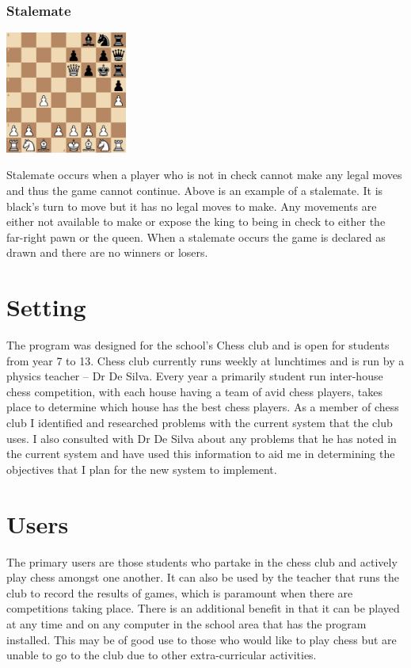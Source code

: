 \documentclass[]{report}
\begin{document}
\subsubsection{Stalemate}
\begin{center}
	\includegraphics[width=0.3\textwidth]{images/boards/stalemate_example}
\end{center}
Stalemate occurs when a player who is not in check cannot make any legal moves and thus the game cannot continue. Above is an example of a stalemate. It is black’s turn to move but it has no legal moves to make. Any movements are either not available to make or expose the king to being in check to either the far-right pawn or the queen. When a stalemate occurs the game is declared as drawn and there are no winners or losers.
\section{Setting}
The program was designed for the school’s Chess club and is open for students from year 7 to 13. Chess club currently runs weekly at lunchtimes and is run by a physics teacher – Dr De Silva. Every year a primarily student run inter-house chess competition, with each house having a team of avid chess players, takes place to determine which house has the best chess players. As a member of chess club I identified and researched problems with the current system that the club uses. I also consulted with Dr De Silva about any problems that he has noted in the current system and have used this information to aid me in determining the objectives that I plan for the new system to implement.
\section{Users}
The primary users are those students who partake in the chess club and actively play chess amongst one another. It can also be used by the teacher that runs the club to record the results of games, which is paramount when there are competitions taking place. There is an additional benefit in that it can be played at any time and on any computer in the school area that has the program installed. This may be of good use to those who would like to play chess but are unable to go to the club due to other extra-curricular activities.
\end{document}
